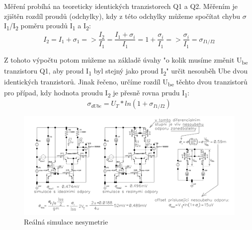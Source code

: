 Měření probíhá na teoreticky identických tranzistorech Q1 a Q2. Měřením je zjištěn rozdíl proudů (odchylky), kdy z této odchylky můžeme spočítat chybu $\sigma$I\textsubscript{1}/I\textsubscript{2} poměru proudů I\textsubscript{1} a I\textsubscript{2}:
\begin{equation}
I_{2} = I_{1}+\sigma_{1} => \frac{I_{2}}{I_{1}} = \frac{I_{1}+\sigma_{i}}{I_{1}}=1+\frac{\sigma_{i}}{I_{1}} => \frac{\sigma_{i}}{I_{1}} = \sigma_{I1/I2}
\end{equation}

Z tohoto výpočtu potom můžeme na základě úvahy "o kolik musíme změnit U\textsubscript{be} tranzistoru Q1, aby proud I\textsubscript{1} byl stejný jako proud I\textsubscript{2}" určit nesouběh Ube dvou identických tranzistorů. Jinak řečeno, určíme rozdíl U\textsubscript{be} těchto dvou tranzistorů pro případ, kdy hodnota proudu I\textsubscript{2} je přesně rovna prudu I\textsubscript{1}:
\begin{equation}
\sigma_{dUbe} = U_{T}*ln(1+\sigma_{I1/I2})
\end{equation}

\begin{figure}[h]
   \begin{center}
     \includegraphics[scale=0.4]{images/Soubeh.png}
   \end{center}
   \caption{Reálná simulace nesymetrie}
\end{figure}

























